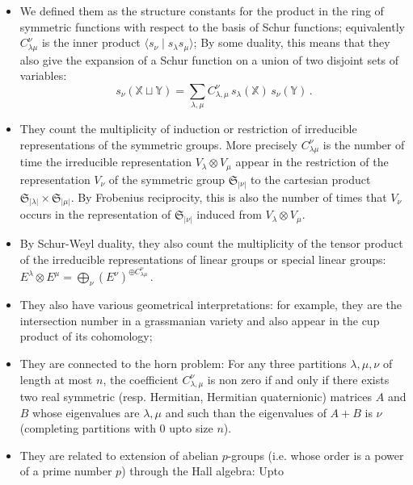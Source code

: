 \documentclass[12pt,a4paper]{article}
\newcommand{\SG}{{\mathfrak S}}
\newcommand{\alphX}{{\mathbb X}}
\newcommand{\alphY}{{\mathbb Y}}
\begin{document}
\begin{itemize}
\item We defined them as the structure constants for the product in the ring
  of symmetric functions with respect to the basis of Schur functions;
  equivalently $C_{\lambda\mu}^\nu$ is the inner product $\langle s_\nu \mid
  s_\lambda s_\mu\rangle$; By some duality, this means that they also give the
  expansion of a Schur function on a union of two disjoint sets of variables:
  \begin{equation}
    s_\nu(\alphX\sqcup\alphY) = 
    \sum_{\lambda,\mu} C_{\lambda,\mu}^{\nu}\,
    s_\lambda(\alphX)\, s_\nu(\alphY)\,.
  \end{equation}
\item They count the multiplicity of induction or restriction of irreducible
  representations of the symmetric groups. More precisely $C_{\lambda\mu}^\nu$
  is the number of time the irreducible representation $V_\lambda \otimes
  V_\mu$ appear in the restriction of the representation $V_\nu$ of the
  symmetric group $\SG_{|\nu|}$ to the cartesian product $\SG_{|\lambda|}
  \times \SG_{|\mu|}$. By Frobenius reciprocity, this is also the number of
  times that $V_\nu$ occurs in the representation of $\SG_{|\nu|}$ induced
  from $V_\lambda \otimes V_\mu$.
\item By Schur-Weyl duality, they also count the multiplicity of the tensor
  product of the irreducible representations of linear groups or special
  linear groups:
    $E^\lambda \otimes E^\mu =\bigoplus_\nu (E^\nu)^{\oplus C_{\lambda\mu}^\nu}\,.$
  \item They also have various geometrical interpretations: for example, they
    are the intersection number in a grassmanian variety and also appear in
    the cup product of its cohomology;
  \item They are connected to the horn problem: For any three partitions
    $\lambda,\mu,\nu$ of length at most $n$, the coefficient
    $C_{\lambda,\mu}^{\nu}$ is non zero if and only if there exists two real
    symmetric (resp. Hermitian, Hermitian quaternionic) matrices $A$ and $B$
    whose eigenvalues are $\lambda,\mu$ and such than the eigenvalues of $A+B$
    is $\nu$ (completing partitions with $0$ upto size $n$).
  \item They are related to extension of abelian $p$-groups (i.e. whose order
    is a power of a prime number $p$) through the Hall algebra: Upto

\end{itemize}
\end{document}
